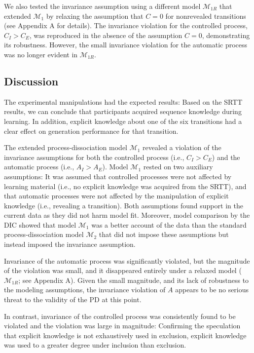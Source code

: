 \documentclass[jou]{apa6}
\theoremstyle{definition}
\theoremstyle{definition}
\theoremstyle{definition}
\theoremstyle{remark}
\begin{document}
We also tested the invariance assumption using a different model
\(\mathcal{M}_{1R}\) that extended \(\mathcal{M}_1\) by relaxing the
assumption that \(C = 0\) for nonrevealed transitions (see Appendix A
for details). The invariance violation for the controlled process,
\(C_I > C_E\), was reproduced in the absence of the assumption \(C=0\),
demonstrating its robustness. However, the small invariance violation
for the automatic process was no longer evident in \(\mathcal{M}_{1R}\).

\subsection{Discussion}\label{discussion-1}

The experimental manipulations had the expected results: Based on the
SRTT results, we can conclude that participants acquired sequence
knowledge during learning. In addition, explicit knowledge about one of
the six transitions had a clear effect on generation performance for
that transition.

The extended process-dissociation model \(\mathcal{M}_1\) revealed a
violation of the invariance assumptions for both the controlled process
(i.e., \(C_I > C_E\)) and the automatic process (i.e., \(A_I > A_E\)).
Model \(\mathcal{M}_1\) rested on two auxiliary assumptions: It was
assumed that controlled processes were not affected by learning material
(i.e., no explicit knowledge was acquired from the SRTT), and that
automatic processes were not affected by the manipulation of explicit
knowledge (i.e., revealing a transition). Both assumptions found support
in the current data as they did not harm model fit. Moreover, model
comparison by the DIC showed that model \(\mathcal{M}_1\) was a better
account of the data than the standard process-dissociation model
\(\mathcal{M}_2\) that did not impose these assumptions but instead
imposed the invariance assumption.

Invariance of the automatic process was significantly violated, but the
magnitude of the violation was small, and it disappeared entirely under
a relaxed model (\(\mathcal{M}_{1R}\); see Appendix A). Given the small
magnitude, and its lack of robustness to the modeling assumptions, the
invariance violation of \(A\) appears to be no serious threat to the
validity of the PD at this point.

In contrast, invariance of the controlled process was consistently found
to be violated and the violation was large in magnitude: Confirming the
speculation that explicit knowledge is not exhaustively used in
exclusion, explicit knowledge was used to a greater degree under
inclusion than exclusion.
\end{document}
